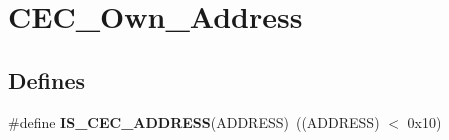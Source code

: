 \hypertarget{group__CEC__Own__Address}{
\section{CEC\_\-Own\_\-Address}
\label{group__CEC__Own__Address}
}
\subsection*{Defines}
\begin{DoxyCompactItemize}
\item 
\hypertarget{group__CEC__Own__Address_ga0659314b0be6092e73aa373394816557}{
\#define {\bfseries IS\_\-CEC\_\-ADDRESS}(ADDRESS)~((ADDRESS) $<$ 0x10)}
\label{group__CEC__Own__Address_ga0659314b0be6092e73aa373394816557}

\end{DoxyCompactItemize}
